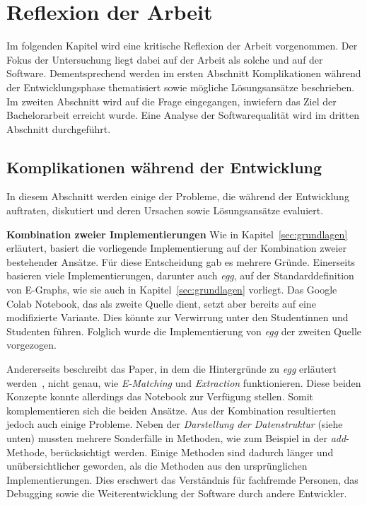 \section{Reflexion der Arbeit}\label{sec:reflexion}

Im folgenden Kapitel wird eine kritische Reflexion der Arbeit vorgenommen. 
Der Fokus der Untersuchung liegt dabei auf der Arbeit als solche und auf der Software.
Dementsprechend werden im ersten Abschnitt Komplikationen während der Entwicklungsphase thematisiert sowie mögliche Lösungsansätze beschrieben.
Im zweiten Abschnitt wird auf die Frage eingegangen, inwiefern das Ziel der Bachelorarbeit erreicht wurde.
Eine Analyse der Softwarequalität wird im dritten Abschnitt durchgeführt.

\subsection{Komplikationen während der Entwicklung}\label{sec:probleme}

In diesem Abschnitt werden einige der Probleme, die während der Entwicklung auftraten, diskutiert und deren Ursachen sowie Lösungsansätze evaluiert.

\noindent\textbf{Kombination zweier Implementierungen} Wie in Kapitel~\ref{sec:grundlagen} erläutert, basiert die vorliegende Implementierung
auf der Kombination zweier bestehender Ansätze. Für diese Entscheidung gab es mehrere Gründe.
Einerseits basieren viele Implementierungen, darunter auch \textit{egg}, auf der Standarddefinition von E-Graphs, wie sie auch in Kapitel~\ref{sec:grundlagen} vorliegt.
Das Google Colab Notebook, das als zweite Quelle dient, setzt aber bereits auf eine modifizierte Variante. Dies könnte zur Verwirrung unter den Studentinnen und Studenten
führen. Folglich wurde die Implementierung von \textit{egg} der zweiten Quelle vorgezogen.

Andererseits beschreibt das Paper, in dem die Hintergründe zu \textit{egg} erläutert werden~\cite{2021-egg}, nicht genau, wie \textit{E-Matching} und \textit{Extraction} funktionieren.  
Diese beiden Konzepte konnte allerdings das Notebook zur Verfügung stellen. Somit komplementieren sich die beiden Ansätze.
Aus der Kombination resultierten jedoch auch einige Probleme. Neben der \textit{Darstellung der Datenstruktur} (siehe unten) mussten mehrere Sonderfälle in Methoden, wie zum Beispiel in der \textit{add}-Methode,
berücksichtigt werden. Einige Methoden sind dadurch länger und unübersichtlicher geworden, als die Methoden aus den ursprünglichen Implementierungen. 
Dies erschwert das Verständnis für fachfremde Personen, das Debugging sowie die Weiterentwicklung der Software durch andere Entwickler.

